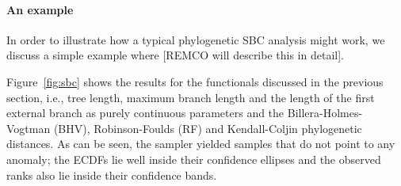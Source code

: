 \documentclass[oneside]{article}
\begin{document}
\paragraph{An example}

In order to illustrate how a typical phylogenetic SBC analysis might work, we discuss a simple example where [REMCO will describe this in detail].

Figure~\ref{fig:sbc} shows the results for the functionals discussed in the previous section, i.e., tree length, maximum branch length and the length of the first external branch as purely continuous parameters and the Billera-Holmes-Vogtman (BHV), Robinson-Foulds (RF) and Kendall-Coljin phylogenetic distances.
As can be seen, the sampler yielded samples that do not point to any anomaly; the ECDFs lie well inside their confidence ellipses and the observed ranks also lie inside their confidence bands.
\end{document}
